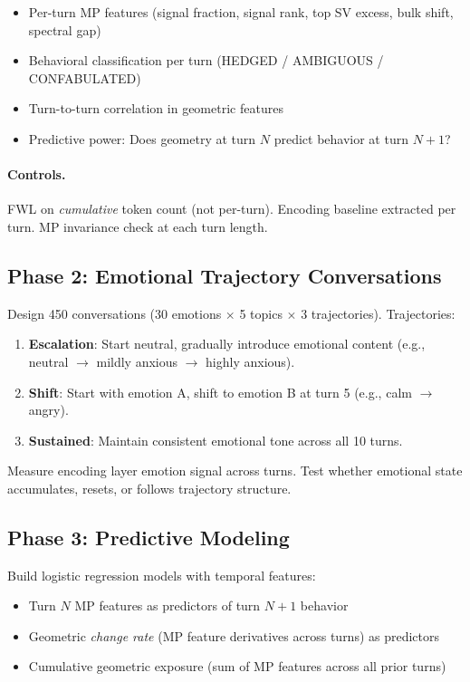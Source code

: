 \documentclass[11pt,letterpaper]{article}
\begin{document}
\begin{itemize}
  \item Per-turn MP features (signal fraction, signal rank, top SV
    excess, bulk shift, spectral gap)
  \item Behavioral classification per turn (HEDGED / AMBIGUOUS /
    CONFABULATED)
  \item Turn-to-turn correlation in geometric features
  \item Predictive power: Does geometry at turn $N$ predict behavior
    at turn $N+1$?
\end{itemize}

\paragraph{Controls.} FWL on \emph{cumulative} token count (not
per-turn). Encoding baseline extracted per turn. MP invariance check
at each turn length.

\subsection{Phase 2: Emotional Trajectory Conversations}

Design 450 conversations (30 emotions $\times$ 5 topics $\times$ 3
trajectories). Trajectories:

\begin{enumerate}
  \item \textbf{Escalation}: Start neutral, gradually introduce
    emotional content (e.g., neutral $\to$ mildly anxious $\to$
    highly anxious).
  \item \textbf{Shift}: Start with emotion A, shift to emotion B at
    turn 5 (e.g., calm $\to$ angry).
  \item \textbf{Sustained}: Maintain consistent emotional tone across
    all 10 turns.
\end{enumerate}

\noindent Measure encoding layer emotion signal across turns. Test
whether emotional state accumulates, resets, or follows trajectory
structure.

\subsection{Phase 3: Predictive Modeling}

Build logistic regression models with temporal features:

\begin{itemize}
  \item Turn $N$ MP features as predictors of turn $N+1$ behavior
  \item Geometric \emph{change rate} (MP feature derivatives across
    turns) as predictors
  \item Cumulative geometric exposure (sum of MP features across all
    prior turns)
\end{itemize}
\end{document}

